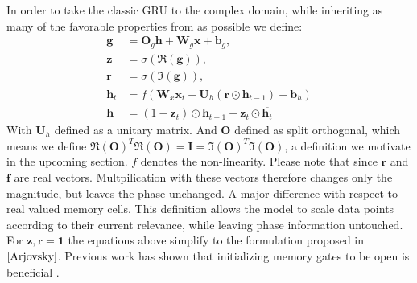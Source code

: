 \documentclass{article}
\begin{document}
In order to take the classic GRU to the complex domain, while inheriting as many of the favorable properties from \cite{Arjovsky} as possible we define:
\begin{align}
\mathbf{g} &= \mathbf{O}_g \mathbf{h} + \mathbf{W}_g\mathbf{x} + \mathbf{b}_g, \\
\mathbf{z} &= \sigma(\Re(\mathbf{g})), \\
\mathbf{r} &= \sigma(\Im(\mathbf{g})), \\
\overline{\mathbf{h}}_{t} &= f(\mathbf{W}_x \mathbf{x}_t + \mathbf{U}_h (\mathbf{r} \odot \mathbf{h}_{t-1}) + \mathbf{b}_h) \\
\mathbf{h} &= (1 - \mathbf{z}_t) \odot \mathbf{h}_{t-1} +  \mathbf{z}_t \odot \overline{\mathbf{h}_t} \label{eq:gru-sum}
\end{align}
With $\mathbf{U}_h$ defined as a unitary matrix. And $\mathbf{O}$ defined as split orthogonal, which means we define $\Re(\mathbf{O})^{T}\Re(\mathbf{O}) = \mathbf{I} = \Im(\mathbf{O})^{T}\Im(\mathbf{O})$, a definition we motivate in the upcoming section. $f$ denotes the non-linearity. Please note that since $\mathbf{r}$ and $\mathbf{f}$ are real vectors. Multpilication with these vectors therefore changes only the magnitude, but leaves the phase unchanged. A major difference with respect to real valued memory cells. This definition allows the model to scale data points according to their current relevance, while leaving phase information untouched. \\
For $\mathbf{z}, \mathbf{r} = \mathbf{1}$ the equations above simplify to the formulation proposed in $\cite{Arjovsky}$. Previous work has shown that initializing memory gates to be open is beneficial .
\end{document}
